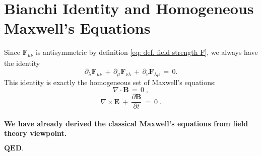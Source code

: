 \documentclass[11pt]{article}
\numberwithin{equation}{section}
\begin{document}
\section{Bianchi Identity and Homogeneous Maxwell's Equations}
Since $\mathbf F_{\mu\nu}$ is antisymmetric by definition \eqref{eq: def. field strength F}, we always have the identity
\begin{equation}
     \partial_\lambda\mathbf F_{\mu\nu}\,+\,\partial_\mu\mathbf F_{\nu\lambda}\,+\,\partial_\nu\mathbf F_{\lambda\mu}\,=\,0.
\end{equation}
This identity is exactly the homogeneous set of Maxwell's equations:
\begin{equation}
    \nabla\cdot\mathbf B\,=\,0\;,
\end{equation}
\begin{equation}
    \nabla\times\mathbf E\:+\:\frac{\partial\mathbf B}{\partial t}\:=\:0\;.
\end{equation}
\\[1em]
\textbf{We have already derived the classical Maxwell's equations from field theory viewpoint. }
\\[0.5em]
\begin{flushright}
    $\mathbf{QED.}$
\end{flushright}
\end{document}
